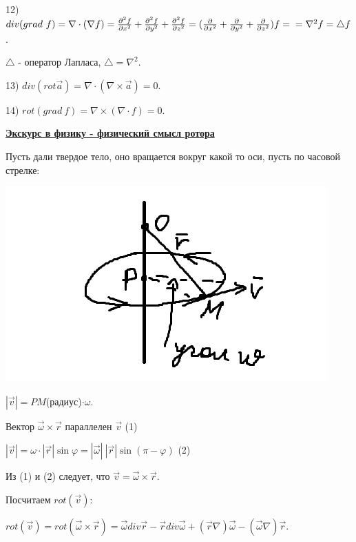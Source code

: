 \documentclass[12pt]{article}
\begin{document}
12) $div (grad \ f) = \nabla \cdot ({\nabla f}) = \frac{\partial^2 f}{\partial x^2} + \frac{\partial^2 f}{\partial y^2} + \frac{\partial^2 f}{\partial z^2} = (\frac{\partial}{\partial x^2} + \frac{\partial}{\partial y^2} + \frac{\partial}{\partial z^2})f =\\= \nabla^2 f = \bigtriangleup f$.\par
$\bigtriangleup$ - оператор Лапласа, $\bigtriangleup = \nabla^2$.\par
13) $div (rot \overrightarrow{a}) = \nabla \cdot (\nabla \times \overrightarrow{a}) = 0$.\par
14) $rot (grad \ f) = \nabla \times (\nabla \cdot f) = 0$.\par
\textbf{\uline{Экскурс в физику - физический смысл ротора}}\par
Пусть дали твердое тело, оно вращается вокруг какой то оси, пусть по часовой стрелке:\par
\includegraphics{rotorPhysicDefinition}\par
$|\overrightarrow{v}| = PM$(радиус)$\cdot \omega$.\par
Вектор $\overrightarrow{\omega} \times \overrightarrow{r}$ параллелен $\overrightarrow{v}$ (1)\par
$|\overrightarrow{v}| = \omega \cdot |\overrightarrow{r}| \sin \varphi = |\overrightarrow{\omega}| \ |\overrightarrow{r}| \sin (\pi - \varphi)$ (2)\par
Из (1) и (2) следует, что $\overrightarrow{v} = \overrightarrow{\omega} \times \overrightarrow{r}$.\par
Посчитаем $rot (\overrightarrow{v})$:\par
$rot(\overrightarrow{v})=rot(\overrightarrow{\omega} \times \overrightarrow{r}) = \overrightarrow{\omega} div \overrightarrow{r} - \overrightarrow{r} div \overrightarrow{\omega} + (\overrightarrow{r} \nabla) \overrightarrow{\omega} - (\overrightarrow{\omega} \nabla) \overrightarrow{r}$.\par
\end{document}
